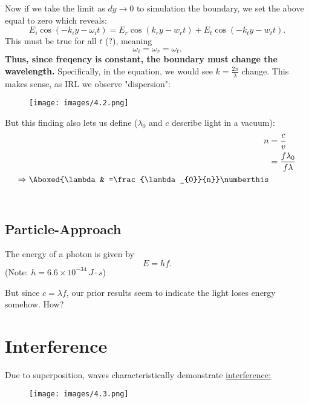\documentclass{article}
\begin{document}
Now if we take the limit as $dy\rightarrow 0$ to simulation the boundary, we set the above equal to zero which reveals:
\begin{equation*}
E_{i}\cos( -k_{i} y-\omega _{i} t) =E_{r}\cos( k_{r} y-w_{r} t) +E_{t}\cos( -k_{t} y-w_{t} t) .
\end{equation*}
This must be true for all $t$ (?), meaning
\begin{equation*}
\omega _{i} =\omega _{r} =\omega _{t} .
\end{equation*}
\textbf{Thus, since freqency is constant, the boundary must change the wavelength.} Specifically, in the equation, we would see $k=\frac{2\pi }{\lambda }$ change. This makes sense, as IRL we observe "dispersion":

\begin{figure}[htp]
    \centering
    \texttt{[image: images/4.2.png]}
\end{figure}

But this finding also lets us define ($\lambda _{0}$ and $c$ describe light in a vacuum):
\begin{align*}
n & =\frac{c}{v}\\
 & =\frac{f\lambda _{0}}{f\lambda }\\
\Rightarrow \Aboxed{\lambda  & =\frac{\lambda _{0}}{n}} \numberthis
\end{align*}
\

\hline
\subsection{Particle-Approach}

The energy of a photon is given by
\begin{equation*}
E=hf.
\end{equation*}
(Note: $h=6.6\times 10^{-34} \ J\cdot s$)

But since $c=\lambda f$, our prior results seem to indicate the light loses energy somehow. How?



\newpage

\hline
\section{Interference}

Due to superposition, waves characteristically demonstrate \underline{interference:}

\begin{figure}[htp]
    \centering
    \texttt{[image: images/4.3.png]}
\end{figure}
\end{document}
